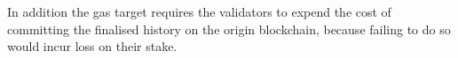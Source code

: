 \documentclass[12pt,a4paper]{article}
\begin{document}
In addition the gas target requires the validators to expend the cost of committing the finalised history on the origin blockchain, because failing to do so would incur loss on their stake.

%
%
%
%
\end{document}
